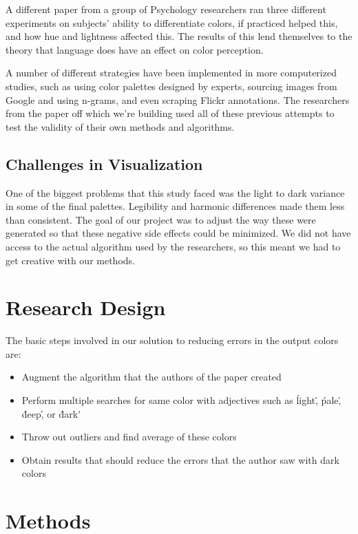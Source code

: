 \documentclass[journal]{vgtc}                %
\begin{document}
A different paper from a group of Psychology researchers ran three different experiments on subjects' ability to differentiate colors, if practiced helped this, and how hue and lightness affected this.
The results of this lend themselves to the theory that language does have an effect on color perception. \cite{ozgen}

A number of different strategies have been implemented in more computerized studies, such as using color palettes designed by experts, sourcing images from Google and using n-grams, and even scraping Flickr annotations.
The researchers from the paper off which we're building used all of these previous attempts to test the validity of their own methods and algorithms.


\subsection{Challenges in Visualization}
One of the biggest problems that this study faced was the light to dark variance in some of the final palettes.
Legibility and harmonic differences made them less than consistent.
The goal of our project was to adjust the way these were generated so that these negative side effects could be minimized.
We did not have access to the actual algorithm used by the researchers, so this meant we had to get creative with our methods.


\section{Research Design}
The basic steps involved in our solution to reducing errors in the output colors are:
\begin{itemize}
  \item Augment the algorithm that the authors of the paper created
  \item Perform multiple searches for same color with adjectives such as \'light\', \'pale\', \'deep\', or \'dark\'
  \item Throw out outliers and find average of these colors
  \item Obtain results that should reduce the errors that the author saw with dark colors
\end{itemize}

\section{Methods}
\end{document}
